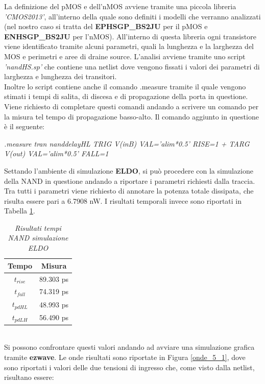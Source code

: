 La definizione del pMOS e dell'nMOS avviene tramite una piccola libreria \textit{'CMOS2013'}, all'interno della quale sono definiti i modelli che verranno analizzati (nel nostro caso si tratta del \textbf{EPHSGP\_BS2JU} per il pMOS e \textbf{ENHSGP\_BS2JU} per l'nMOS). All'interno di questa libreria ogni transistore viene identificato tramite alcuni parametri, quali la lunghezza e la larghezza del MOS e perimetri e aree di draine source.
L'analisi avviene tramite uno script \textit{'nandHS.sp'} che contiene una netlist dove vengono fissati i valori dei parametri di larghezza e lunghezza dei transitori.\\
Inoltre lo script contiene anche il comando .measure tramite il quale vengono stimati i tempi di salita, di discesa e di propagazione della porta in questione. Viene richiesto di completare questi comandi andando a scrivere un comando per la misura tel tempo di propagazione basso-alto. Il comando aggiunto in questione è il seguente:
\begin{center}
\textit{.measure tran nanddelayHL TRIG V(inB) VAL='alim*0.5' RISE=1 
+ TARG V(out) VAL='alim*0.5' FALL=1}
\end{center}
Settando l'ambiente di simulazione \textbf{ELDO}, si può procedere con la simulazione della NAND in questione andando a riportare i parametri richiesti dalla traccia. Tra tutti i parametri viene richiesto di annotare la potenza totale dissipata, che risulta essere pari a 6.7908 nW. I risultati temporali invece sono riportati in Tabella \ref{Tab5_1}.\\
\begin{table}[!h]\footnotesize
	\centering
	\begin{tabular}{|c|c|}
		\hline
		\textbf{Tempo} & \textbf{Misura}\\
		\hline
		$t_{rise}$ & 89.303 ps\\
		$t_{fall}$ & 74.319 ps\\
		$t_{pdHL}$ & 48.993 ps\\
		$t_{pdLH}$ & 56.490 ps\\
		\hline
	\end{tabular}
	\caption{\textit{Risultati tempi NAND simulazione ELDO}}
	\label{Tab5_1}
\end{table}
\\
Si possono confrontare questi valori andando ad avviare una simulazione grafica tramite \textbf{ezwave}. Le onde risultati sono riportate in Figura \ref{onde_5_1}, dove sono riportati i valori delle due tensioni di ingresso che, come visto dalla netlist, risultano essere:
